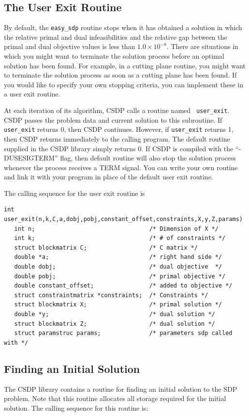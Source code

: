 \documentclass{article}
\begin{document}
\subsection*{The User Exit Routine}
By default, the {\tt easy\_sdp} routine stops when it has obtained a
solution in which the relative primal and dual infeasibilities and the
relative gap between the primal and dual objective values is less than
$1.0 \times 10^{-8}$.  There are situations in which you might want to
terminate the solution process before an optimal solution has been
found.  For example, in a cutting plane routine, you might want to
terminate the solution process as soon as a cutting plane has been
found.  If you would like to specify your own stopping criteria, you
can implement these in a user exit routine.

At each iteration of its algorithm, CSDP calls a routine named {\tt
user\_exit}.  CSDP passes the problem data and current solution to
this subroutine.  If {\tt user\_exit} returns 0, then CSDP continues.
However, if {\tt user\_exit} returns 1, then CSDP returns immediately
to the calling program.  The default routine supplied in the CSDP
library simply returns 0.  If CSDP is compiled 
with the ``-DUSESIGTERM'' flag, then default routine will also stop
the solution process whenever the process receives a TERM signal.
You can write your own routine and link it
with your program in place of the default user exit routine.

The calling sequence for the user exit routine is
\begin{verbatim}
int user_exit(n,k,C,a,dobj,pobj,constant_offset,constraints,X,y,Z,params)
   int n;                                 /* Dimension of X */
   int k;                                 /* # of constraints */
   struct blockmatrix C;                  /* C matrix */
   double *a;                             /* right hand side */
   double dobj;                           /* dual objective  */
   double pobj;                           /* primal objective */
   double constant_offset;                /* added to objective */ 
   struct constraintmatrix *constraints;  /* Constraints */
   struct blockmatrix X;                  /* primal solution */
   double *y;                             /* dual solution */
   struct blockmatrix Z;                  /* dual solution */
   struct paramstruc params;              /* parameters sdp called with */
\end{verbatim}
\subsection*{Finding an Initial Solution}
The CSDP library contains a routine for finding an initial solution to the
SDP problem.  Note that this routine allocates all storage required for the
initial solution.  The calling sequence for this routine is:
\end{document}
